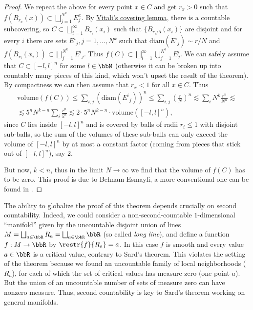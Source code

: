 \begin{proof}
    We repeat the above for every point $x\in C$ and get $r_x>0$ such that $f(B_{r_x}(x))\subset \bigsqcup_{j=1}^{N^k}E_j^x$. By \href{https://en.wikipedia.org/wiki/Vitali_covering_lemma}{Vitali's covering lemma}, there is a countable subcovering, so $C\subset \bigsqcup_{i=1}^\infty B_{r_i}(x_i)$ such that $\{B_{r_i/5}(x_i)\}$ are disjoint and for every $i$ there are sets $E^i{}_j,j=1,\ldots,N^k$ such that $\mathrm{diam}(E^i{}_j)\sim r/N$ and $f(B_{r_i}(x_i))\subset \bigsqcup_{j=1}^{N^k}E^i{}_j$. Thus $f(C)\subset \bigsqcup_{i=1}^\infty\bigcup_{j=1}^{N^k}E_j^i$. We can safely assume that $C\subset [-l,l]^n$ for some $l\in \bbN$ (otherwise it can be broken up into countably many pieces of this kind, which won't upset the result of the theorem). By compactness we can then assume that $r_x<1$ for all $x\in C$. Thus
    \begin{multline}
        \mathrm{volume}(f(C))\leq \sum_{i,j}(\mathrm{diam}(E^i{}_j))^n\leq \sum_{i,j}\left(\frac rN\right)^n\lesssim \sum_{i}N^k\frac{r^n}{N^n}\lesssim \\
        \lesssim 5^nN^{k-n}\sum_i\frac{r^n}{5^n}\lesssim 2\cdot 5^n N^{k-n}\cdot \mathrm{volume}([-l,l]^n),
    \end{multline}
    since $C$ lies inside $[-l,l]^n$ and is covered by balls of radii $r_i\leq 1$ with disjoint sub-balls, so the sum of the volumes of these sub-balls can only exceed the volume of $[-l,l]^n$ by at most a constant factor (coming from pieces that stick out of $[-l,l]^n$), say $2$.

    But now, $k<n$, thus in the limit $N\to \infty$ we find that the volume of $f(C)$ has to be zero. This proof is due to Behnam Esmayli, a more conventional one can be found in \cite[Thm.~6.10]{Lee}.
\end{proof}
\begin{rem}
    The ability to globalize the proof of this theorem depends crucially on second countability. Indeed, we could consider a non-second-countable $1$-dimensional ``manifold'' given by the uncountable disjoint union of lines $M=\bigsqcup_{a\in \bbR} R_a=\bigsqcup_{a\in \bbR} \bbR$ (so called \emph{long line}), and define a function $f:M\to \bbR$ by $\restr{f}{R_a}=a$. In this case $f$ is smooth and every value $a\in\bbR$ is a critical value, contrary to Sard's theorem. This violates the setting of the theorem because we found an uncountable family of local neighborhoods ($R_a$), for each of which the set of critical values has measure zero (one point $a$). But the union of an uncountable number of sets of measure zero can have nonzero measure. Thus, second countability is key to Sard's theorem working on general manifolds.
\end{rem}






